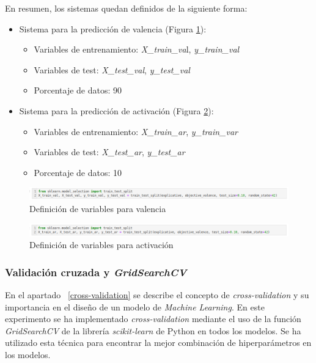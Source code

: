 \documentclass[12pt,a4paper,Spanish]{article}
\begin{document}
En resumen, los sistemas quedan definidos de la siguiente forma:
\begin{itemize}
	\item Sistema para la predicción de valencia (Figura \ref{fig:splitvalence}):
	\begin{itemize}
		\item Variables de entrenamiento: \textit{X\_train\_va}l, \textit{y\_train\_val}
		\item Variables de test: \textit{X\_test\_val}, \textit{y\_test\_val}
		\item Porcentaje de datos: 90
	\end{itemize}
	\item Sistema para la predicción de activación (Figura \ref{fig:splitarousal}):
	\begin{itemize}
		\item Variables de entrenamiento: \textit{X\_train\_ar}, \textit{y\_train\_var}
		\item Variables de test: \textit{X\_test\_ar}, \textit{y\_test\_ar}
		\item Porcentaje de datos: 10
	\end{itemize}

\end{itemize}

\begin{figure}[H]
	\centering
	\includegraphics[width=1\linewidth]{figs/split_valence}
	\caption{Definición de variables para valencia}
	\label{fig:splitvalence}
\end{figure}
\begin{figure}[H]
	\centering
	\includegraphics[width=1\linewidth]{figs/split_arousal}
	\caption{Definición de variables para activación}
	\label{fig:splitarousal}
\end{figure}




\subsubsection{Validación cruzada y \textit{GridSearchCV}}\label{gridsearchcv}
En el apartado ~\ref{cross-validation} se describe el concepto de \textit{cross-validation} y su importancia en el diseño de un modelo de \textit{Machine Learning}. En este experimento se ha implementado \textit{cross-validation} mediante el uso de la función \textit{GridSearchCV} de la librería \textit{scikit-learn} de Python \cite{scikit-learn} en todos los modelos. Se ha utilizado esta técnica para encontrar la mejor combinación de hiperparámetros en los modelos.
\newline
\end{document}
